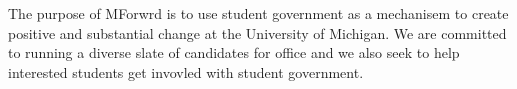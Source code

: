 The purpose of MForwrd is to use student government as a mechanisem to create positive and substantial change at the University of Michigan. We are committed to running a diverse slate of candidates for office and we also seek to help interested students get invovled with student government.
